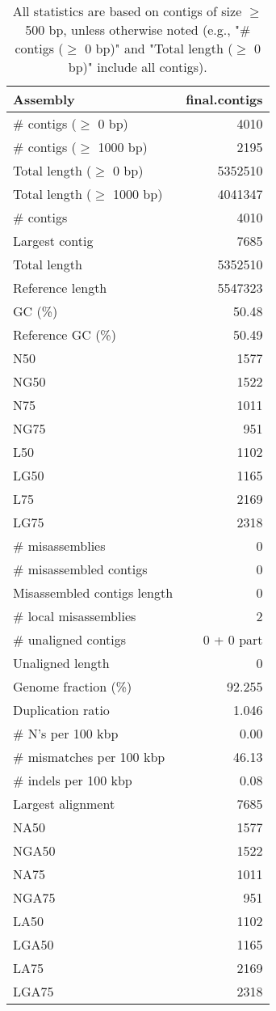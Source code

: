 \documentclass[12pt,a4paper]{article}
\begin{document}
\begin{table}[ht]
\begin{center}
\caption{All statistics are based on contigs of size $\geq$ 500 bp, unless otherwise noted (e.g., "\# contigs ($\geq$ 0 bp)" and "Total length ($\geq$ 0 bp)" include all contigs).}
\begin{tabular}{|l*{1}{|r}|}
\hline
Assembly & final.contigs \\ \hline
\# contigs ($\geq$ 0 bp) & 4010 \\ \hline
\# contigs ($\geq$ 1000 bp) & 2195 \\ \hline
Total length ($\geq$ 0 bp) & 5352510 \\ \hline
Total length ($\geq$ 1000 bp) & 4041347 \\ \hline
\# contigs & 4010 \\ \hline
Largest contig & 7685 \\ \hline
Total length & 5352510 \\ \hline
Reference length & 5547323 \\ \hline
GC (\%) & 50.48 \\ \hline
Reference GC (\%) & 50.49 \\ \hline
N50 & 1577 \\ \hline
NG50 & 1522 \\ \hline
N75 & 1011 \\ \hline
NG75 & 951 \\ \hline
L50 & 1102 \\ \hline
LG50 & 1165 \\ \hline
L75 & 2169 \\ \hline
LG75 & 2318 \\ \hline
\# misassemblies & 0 \\ \hline
\# misassembled contigs & 0 \\ \hline
Misassembled contigs length & 0 \\ \hline
\# local misassemblies & 2 \\ \hline
\# unaligned contigs & 0 + 0 part \\ \hline
Unaligned length & 0 \\ \hline
Genome fraction (\%) & 92.255 \\ \hline
Duplication ratio & 1.046 \\ \hline
\# N's per 100 kbp & 0.00 \\ \hline
\# mismatches per 100 kbp & 46.13 \\ \hline
\# indels per 100 kbp & 0.08 \\ \hline
Largest alignment & 7685 \\ \hline
NA50 & 1577 \\ \hline
NGA50 & 1522 \\ \hline
NA75 & 1011 \\ \hline
NGA75 & 951 \\ \hline
LA50 & 1102 \\ \hline
LGA50 & 1165 \\ \hline
LA75 & 2169 \\ \hline
LGA75 & 2318 \\ \hline
\end{tabular}
\end{center}
\end{table}
\end{document}
